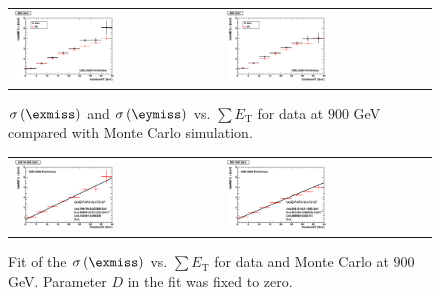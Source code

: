 \begin{figure}[h!]
 \centering
 \begin{tabular}{ll}
  \includegraphics[width=0.5\textwidth]{plots_DataVsMC_MB_900GeV/h_metxsigma_sumet_900.eps} &
  \includegraphics[width=0.5\textwidth]{plots_DataVsMC_MB_900GeV/h_metysigma_sumet_900.eps} \\
 \end{tabular}
 \caption{\small $\sigma\left(\exmiss\right)$ and $\sigma\left(\eymiss\right)$ vs. $\sum E_\text{T}$ for data at $900$ GeV
          compared with Monte Carlo simulation.\label{fig:MExySigma_vs_SumET_900}}
\end{figure}

\begin{figure}[h!]
 \centering
 \begin{tabular}{ll}
  \includegraphics[width=0.5\textwidth]{plots_DataVsMC_MB_900GeV/final_metxsigma_sumet_DATA_900.eps} &
  \includegraphics[width=0.5\textwidth]{plots_DataVsMC_MB_900GeV/final_metxsigma_sumet_MC_900.eps} \\
 \end{tabular}
 \caption{\small Fit of the $\sigma\left(\exmiss\right)$ vs. $\sum E_\text{T}$ for data and Monte Carlo at $900$ GeV. Parameter $D$ in the fit was fixed
          to zero.\label{fig:MExSigma_vs_SumET_900_fit}}
\end{figure}

